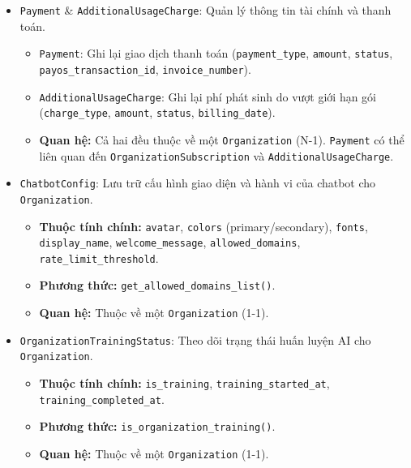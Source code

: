 \begin{itemize}[leftmargin=*, labelsep=4mm]
    \item \texttt{Payment} \& \texttt{AdditionalUsageCharge}: Quản lý thông tin tài chính và thanh toán.
        \begin{itemize}
            \item \texttt{Payment}: Ghi lại giao dịch thanh toán (\texttt{payment\_type}, \texttt{amount}, \texttt{status}, \texttt{payos\_transaction\_id}, \texttt{invoice\_number}). %
            \item \texttt{AdditionalUsageCharge}: Ghi lại phí phát sinh do vượt giới hạn gói (\texttt{charge\_type}, \texttt{amount}, \texttt{status}, \texttt{billing\_date}).
            \item \textbf{Quan hệ:} Cả hai đều thuộc về một \texttt{Organization} (N-1). \texttt{Payment} có thể liên quan đến \texttt{OrganizationSubscription} và \texttt{AdditionalUsageCharge}.
        \end{itemize}

    \item \texttt{ChatbotConfig}: Lưu trữ cấu hình giao diện và hành vi của chatbot cho \texttt{Organization}.
        \begin{itemize}
            \item \textbf{Thuộc tính chính:} \texttt{avatar}, \texttt{colors} (primary/secondary), \texttt{fonts}, \texttt{display\_name}, \texttt{welcome\_message}, \texttt{allowed\_domains}, \texttt{rate\_limit\_threshold}.
            \item \textbf{Phương thức:} \texttt{get\_allowed\_domains\_list()}.
             \item \textbf{Quan hệ:} Thuộc về một \texttt{Organization} (1-1).
        \end{itemize}

    \item \texttt{OrganizationTrainingStatus}: Theo dõi trạng thái huấn luyện AI cho \texttt{Organization}.
        \begin{itemize}
            \item \textbf{Thuộc tính chính:} \texttt{is\_training}, \texttt{training\_started\_at}, \texttt{training\_completed\_at}.
            \item \textbf{Phương thức:} \texttt{is\_organization\_training()}.
            \item \textbf{Quan hệ:} Thuộc về một \texttt{Organization} (1-1).
        \end{itemize}
\end{itemize}

